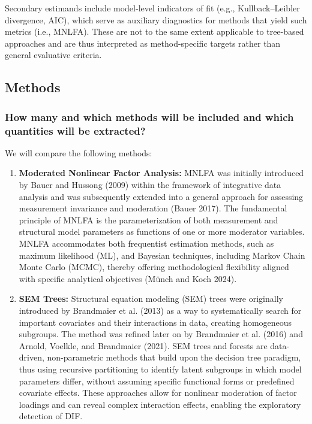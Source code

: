 \documentclass[
  man,
  floatsintext]{apa7}
\begin{document}
Secondary estimands include model-level indicators of fit (e.g.,
Kullback--Leibler divergence, AIC), which serve as auxiliary diagnostics
for methods that yield such metrics (i.e., MNLFA). These are not to the
same extent applicable to tree-based approaches and are thus interpreted
as method-specific targets rather than general evaluative criteria.

\subsection{Methods}\label{methods}

\subsubsection{How many and which methods will be included and which
quantities will be
extracted?}\label{how-many-and-which-methods-will-be-included-and-which-quantities-will-be-extracted}

We will compare the following methods:

\begin{enumerate}
\def\labelenumi{\arabic{enumi})}
\item
  \textbf{Moderated Nonlinear Factor Analysis:} MNLFA was initially
  introduced by Bauer and Hussong (2009) within the framework of
  integrative data analysis and was subsequently extended into a general
  approach for assessing measurement invariance and moderation (Bauer
  2017). The fundamental principle of MNLFA is the parameterization of
  both measurement and structural model parameters as functions of one
  or more moderator variables. MNLFA accommodates both frequentist
  estimation methods, such as maximum likelihood (ML), and Bayesian
  techniques, including Markov Chain Monte Carlo (MCMC), thereby
  offering methodological flexibility aligned with specific analytical
  objectives (Münch and Koch 2024).
\item
  \textbf{SEM Trees:} Structural equation modeling (SEM) trees were
  originally introduced by Brandmaier et al. (2013) as a way to
  systematically search for important covariates and their interactions
  in data, creating homogeneous subgroups. The method was refined later
  on by Brandmaier et al. (2016) and Arnold, Voelkle, and Brandmaier
  (2021). SEM trees and forests are data-driven, non-parametric methods
  that build upon the decision tree paradigm, thus using recursive
  partitioning to identify latent subgroups in which model parameters
  differ, without assuming specific functional forms or predefined
  covariate effects. These approaches allow for nonlinear moderation of
  factor loadings and can reveal complex interaction effects, enabling
  the exploratory detection of DIF.
\end{enumerate}
\end{document}
